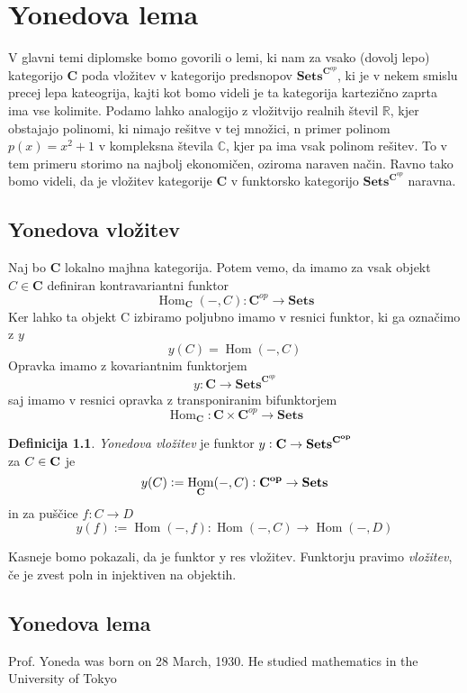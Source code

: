 \documentclass[12pt,a4paper]{book}
\theoremstyle{definition}
\newtheorem{definicija}{Definicija}[chapter]
\theoremstyle{plain}
\theoremstyle{definition}
\theoremstyle{remark}
\newcommand{\cat}[1]{\textbf{#1}}
\DeclareMathOperator{\Hom}{Hom}
\newcommand{\predsnop}[1]{\cat{Sets}^{\cat{#1}^{op}}}
\begin{document}
\chapter{Yonedova lema}

V glavni temi diplomske bomo govorili o lemi, ki nam za vsako (dovolj lepo) kategorijo $\cat{C}$ poda vložitev v kategorijo predsnopov $\predsnop{C}$, ki je v nekem smislu precej lepa kateogrija, kajti kot bomo videli je ta kategorija kartezično zaprta ima vse kolimite.
Podamo lahko analogijo z vložitvijo realnih števil $\mathbb{R}$, kjer obstajajo polinomi, ki nimajo rešitve v tej množici, n primer polinom $p(x) = x^2 + 1$ v kompleksna števila $\mathbb{C}$, kjer pa ima vsak polinom rešitev. To v tem primeru storimo na najbolj ekonomičen, oziroma naraven način. Ravno tako bomo videli, da je vložitev kategorije $\cat{C}$ v funktorsko kategorijo $\predsnop{C}$ naravna.

\section{Yonedova vložitev}

Naj bo $\mathbf{C}$ lokalno majhna kategorija.
Potem vemo, da imamo za vsak objekt $C \in \cat{C}$ definiran kontravariantni funktor 
$$\Hom_{\cat{C}}(-,C) : \cat{C}^{op} \to \cat{Sets}$$
Ker lahko ta objekt C izbiramo poljubno imamo v resnici funktor, ki ga označimo z $y$
$$y(C) = \Hom(-,C) $$
Opravka imamo z kovariantnim funktorjem 
$$y : \mathbf{C} \to \mathbf{Sets}^{\cat{C}^{op}}$$
saj imamo v resnici opravka z transponiranim bifunktorjem
$$\Hom_{\cat{C}} : \cat{C} \times \cat{C}^{op} \to \cat{Sets}$$


\begin{definicija} {\it Yonedova vložitev} je funktor $y : \bf{C} \to \bf{Sets}^{\bf{C}^{op}}$ \\  za $C \in \bf{C}$ je $$y(C) := \Hom_{\bf{C}}(-, C) : \bf{C}^{op} \to \bf{Sets}$$ in za puščice $f : C \to D$
$$y(f) := \Hom(-,f) : \Hom(-,C) \to \Hom(-,D)$$
\end{definicija}

Kasneje bomo pokazali, da je funktor y res vložitev. Funktorju pravimo {\it vložitev}, če je zvest poln in injektiven na objektih.

\section{Yonedova lema}

Prof. Yoneda was born on 28 March, 1930.  He studied mathematics in
the University of Tokyo
\end{document}

